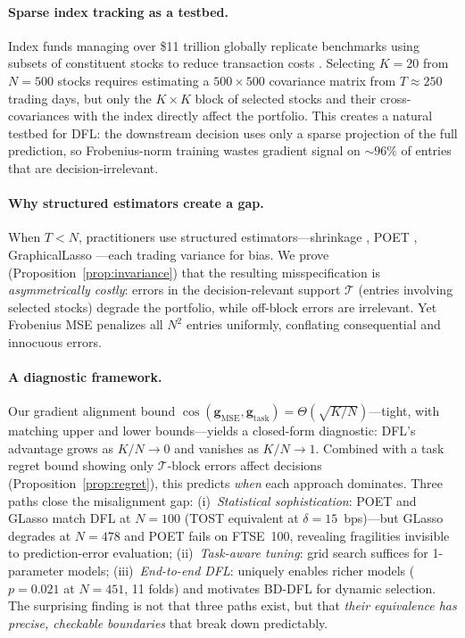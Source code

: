 \documentclass[letterpaper]{article}
\begin{document}
\paragraph{Sparse index tracking as a testbed.}
Index funds managing over \$11 trillion globally \citep{kolm2014years} replicate benchmarks using subsets of constituent stocks to reduce transaction costs \citep{lobo2007portfolio}. Selecting $K{=}20$ from $N{=}500$ stocks requires estimating a $500 \times 500$ covariance matrix from $T \approx 250$ trading days, but only the $K \times K$ block of selected stocks and their cross-covariances with the index directly affect the portfolio. This creates a natural testbed for DFL: the downstream decision uses only a sparse projection of the full prediction, so Frobenius-norm training wastes gradient signal on ${\sim}96\%$ of entries that are decision-irrelevant.

\paragraph{Why structured estimators create a gap.}
When $T < N$, practitioners use structured estimators---shrinkage \citep{ledoit2004well}, POET \citep{fan2013large}, GraphicalLasso \citep{friedman2008sparse}---each trading variance for bias. We prove (Proposition~\ref{prop:invariance}) that the resulting misspecification is \emph{asymmetrically costly}: errors in the decision-relevant support $\mathcal{T}$ (entries involving selected stocks) degrade the portfolio, while off-block errors are irrelevant. Yet Frobenius MSE penalizes all $N^2$ entries uniformly, conflating consequential and innocuous errors.

\paragraph{A diagnostic framework.}
Our gradient alignment bound $\cos(\mathbf{g}_{\text{MSE}}, \mathbf{g}_{\text{task}}) = \Theta(\sqrt{K/N})$---tight, with matching upper and lower bounds---yields a closed-form diagnostic: DFL's advantage grows as $K/N \to 0$ and vanishes as $K/N \to 1$. Combined with a task regret bound showing only $\mathcal{T}$-block errors affect decisions (Proposition~\ref{prop:regret}), this predicts \emph{when} each approach dominates. Three paths close the misalignment gap: (i)~\emph{Statistical sophistication}: POET and GLasso match DFL at $N{=}100$ (TOST equivalent at $\delta{=}15$~bps)---but GLasso degrades at $N{=}478$ and POET fails on FTSE~100, revealing fragilities invisible to prediction-error evaluation; (ii)~\emph{Task-aware tuning}: grid search suffices for 1-parameter models; (iii)~\emph{End-to-end DFL}: uniquely enables richer models ($p = 0.021$ at $N{=}451$, 11 folds) and motivates BD-DFL for dynamic selection. The surprising finding is not that three paths exist, but that \emph{their equivalence has precise, checkable boundaries} that break down predictably.
\end{document}
